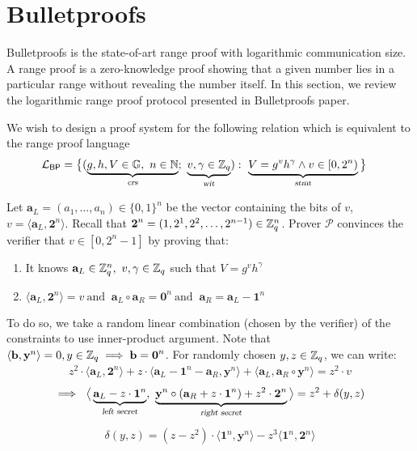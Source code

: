\section{Bulletproofs}
\label{sec:bulletproofs}

Bulletproofs \cite{Bunz2018} is the state-of-art range proof with logarithmic communication size.
A range proof is a zero-knowledge proof showing that a given number lies in a particular range without revealing the number itself.
In this section, we review the logarithmic range proof protocol presented in Bulletproofs paper.

We wish to design a proof system for the following relation which is equivalent to the range proof language
\begin{align}
    \mathcal{L}_{\textsf{BP}} &= \big\{ (\underbrace{g,h, V \in \mathbb{G}, \ n \in \mathbb{N}}_{\textsl{crs}}; \ \underbrace{v, \gamma \in \mathbb{Z}_q}_{\textsl{wit}}): \ \underbrace{V = g^v h^{\gamma} \wedge v \in [0, 2^n)}_{\textsl{stmt}} \big\}
    \label{eqn:lang_bp}
\end{align}

Let $\textbf{a}_L = (a_1, \dots, a_n) \in \{0,1\}^n$ be the vector containing the bits of $v$, $v = \langle \textbf{a}_L,\textbf{2}^n \rangle$. 
Recall that $\textbf{2}^n = (1, 2^1, 2^2, \dots, 2^{n-1}) \in \mathbb{Z}_q^n$.
Prover $\mathcal{P}$ convinces the verifier that $v \in [0,2^n -1]$ by proving that:
\begin{enumerate}
    \item It knows $\textbf{a}_L \in \Z_q^{n}, \ v, \gamma \in \Z_q$ such that $V=g^vh^{\gamma}$
    \item $\langle \textbf{a}_L,\textbf{2}^n \rangle =v
    \ \text{and } \  \textbf{a}_L \circ \textbf{a}_R = \textbf{0}^n \ \text{and } \ 
    \textbf{a}_R = \textbf{a}_L - \textbf{1}^n$
\end{enumerate}

To do so, we take a random linear combination (chosen by the verifier) of the constraints to use inner-product argument. Note that $\langle \textbf{b},\textbf{y}^n \rangle = 0, y \in \mathbb{Z}_q \implies \textbf{b} = \textbf{0}^n$. For randomly chosen $y, z \in \mathbb{Z}_q$, we can write: 
\begin{align}
    z^2 \cdot \langle \textbf{a}_L,\textbf{2}^n \rangle +
    z \cdot \langle \textbf{a}_L - \textbf{1}^n - \textbf{a}_R,\textbf{y}^n \rangle +
    \langle \textbf{a}_L,\textbf{a}_R \circ \textbf{y}^n \rangle =
    z^2 \cdot v
\end{align}
\begin{align}
    \implies \
    \big\langle
    \underbrace{\textbf{a}_L - z\cdot \textbf{1}^n}_{\textsl{left secret}}, \
    \underbrace{\textbf{y}^n \circ (\textbf{a}_R + z\cdot \textbf{1}^n) + z^2 \cdot \textbf{2}^n}_{\textsl{right secret}}
    \big\rangle
    =
    z^2 + \delta(y,z)
    \label{iprf1}
\end{align}
\vspace{-5mm}
\begin{align*}
    \delta(y, z) 
    =
    (z-z^2)\cdot \langle \textbf{1}^n,\textbf{y}^n \rangle - z^3\langle \textbf{1}^n,\textbf{2}^n \rangle
\end{align*}

